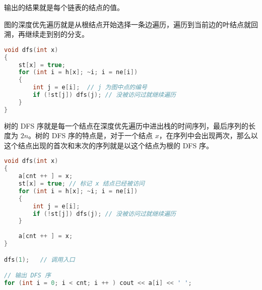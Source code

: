 输出的结果就是每个链表的结点的值。

图的深度优先遍历就是从根结点开始选择一条边遍历，遍历到当前边的叶结点就回溯，再继续走到别的分支。

\begin{lstlisting}[language=cpp]
void dfs(int x)
{
    st[x] = true;
    for (int i = h[x]; ~i; i = ne[i])
    {
        int j = e[i];  // j 为图中点的编号
        if (!st[j]) dfs(j); // 没被访问过就继续遍历
    }
}
\end{lstlisting}

树的 DFS 序就是每一个结点在深度优先遍历中进出栈的时间序列，最后序列的长度为 $2n$。树的 DFS 序的特点是，对于一个结点 $x$，在序列中会出现两次，那么以这个结点出现的首次和末次的序列就是以这个结点为根的 DFS 序。

\begin{lstlisting}[language=cpp]
void dfs(int x)
{
    a[cnt ++ ] = x;
    st[x] = true; // 标记 x 结点已经被访问
    for (int i = h[x]; ~i; i = ne[i])
    {
        int j = e[i];
        if (!st[j]) dfs(j); // 没被访问过就继续遍历
    }
    
    a[cnt ++ ] = x;
}

dfs(1);   // 调用入口

// 输出 DFS 序
for (int i = 0; i < cnt; i ++ ) cout << a[i] << ' ';
\end{lstlisting}